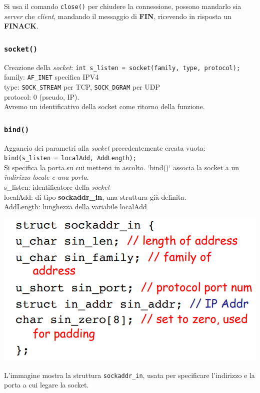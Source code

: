 Si usa il comando \texttt{close()} per chiudere la connessione, possono mandarlo sia \textit{server} che \textit{client}, mandando il messaggio di \textbf{FIN}, ricevendo in risposta un \textbf{FINACK}.

\subsubsection*{\texttt{socket()}}
Creazione della \textit{socket}: \texttt{int s\_listen = socket(family, type, protocol);} \\
family: \texttt{AF\_INET} specifica IPV4 \\ type: \texttt{SOCK\_STREAM} per TCP, \texttt{SOCK\_DGRAM} per UDP \\ protocol: 0 (pseudo, IP). \\
Avremo un identificativo della socket come ritorno della funzione.

\subsubsection*{\texttt{bind()}}
Aggancio dei parametri alla \textit{socket} precedentemente creata vuota: \\
\texttt{bind(s\_listen = localAdd, AddLength);} \\
Si specifica la porta su cui mettersi in ascolto. `bind()` associa la socket a un \textit{indirizzo locale e una porta}. \\
s\_listen: identificatore della \textit{socket} \\
localAdd: di tipo \textbf{sockaddr\_in}, una struttura già definita. \\
AddLength: lunghezza della variabile localAdd \\
\begin{center}
\includegraphics[width=\textwidth]{./img/struct_sockaddr_In.png}
\end{center}
L'immagine mostra la struttura \texttt{sockaddr\_in}, usata per specificare l'indirizzo e la porta a cui legare la socket.

